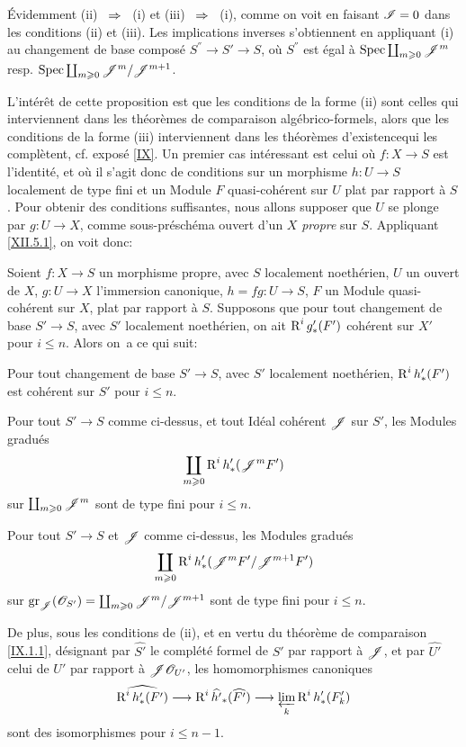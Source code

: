 \'Evidemment (ii) ~$\To$~ (i) et (iii) ~$\To$~ (i), comme on voit en faisant ${\mathscr I}=0$ dans les conditions (ii) et (iii). Les implications inverses s'obtiennent en appliquant (i) au changement de base compos\'e $S^{''}\to S'\to S$, o\`u $S^{''}$ est \'egal \`a $\operatorname{Spec} \coprod_{m\geqslant 0} {\mathscr J}^m$ resp. $\operatorname{Spec} \coprod_{m\geqslant 0} {\mathscr J}^m/{\mathscr J}^{m+1}$.

L'int\'er\^et de cette proposition est que les conditions de la forme (ii) sont celles qui interviennent dans les \og th\'eor\`emes de comparaison alg\'ebrico-formels\fg, alors que les conditions de la forme (iii) interviennent dans les \og th\'eor\`emes d'existence\fg qui les compl\`etent, cf. expos\'e \ref{IX}. Un premier cas int\'eressant est celui o\`u $f:X\to S$ est l'identit\'e, et o\`u il s'agit donc de conditions sur un morphisme $h:U\to S$ localement de type fini et un Module $F$ quasi-coh\'erent sur $U$ plat par rapport \`a $S$. Pour obtenir des conditions suffisantes, nous allons supposer que $U$ se plonge par $g:U\to X$, comme sous-pr\'esch\'ema ouvert d'un $X$ \emph{propre} sur $S$. Appliquant \ref{XII.5.1}, on voit donc:

\begin{corollaire} \label{XII.5.8}
Soient $f:X\to S$ un morphisme propre, avec $S$ localement noeth\'erien, $U$ un ouvert de $X$, $g:U\to X$ l'immersion canonique, $h=fg:U\to S$, $F$ un Module quasi-coh\'erent sur $X$, plat par rapport \`a $S$. Supposons que pour tout changement de base $S'\to S$, avec $S'$ localement noeth\'erien, on ait $\operatorname{R}^ig'_\ast(F')$ coh\'erent sur $X'$ pour $i\leq n$. Alors on~a ce qui suit:
\begin{enumeratei}
\item
Pour tout changement de base $S'\to S$, avec $S'$ localement noeth\'erien, $\operatorname{R}^ih'_\ast(F')$ est coh\'erent sur $S'$ pour $i\leq n$.
\item
Pour tout $S'\to S$ comme ci-dessus, et tout Id\'eal coh\'erent ${\mathscr J}$ sur $S'$, les Modules gradu\'es
\[
\coprod_{m\geqslant 0} \operatorname{R}^ih'_\ast({\mathscr J}^mF')
\]
sur $\coprod_{m\geqslant 0}{\mathscr J}^m$ sont de type fini pour $i\leq n$.
\item
Pour tout $S'\to S$ et ${\mathscr J}$ comme ci-dessus, les Modules gradu\'es
\[
\coprod_{m\geqslant 0} \operatorname{R}^ih'_\ast({\mathscr J}^mF'/{\mathscr J}^{m+1}F')
\]
sur $\operatorname{gr}_{\mathscr J}({\mathscr O}_{S'})=\coprod_{m\geqslant 0}{\mathscr J}^m/{\mathscr J}^{m+1}$ sont de type fini pour $i\leq n$.

De plus, sous les conditions de (ii), et en vertu du th\'eor\`eme de comparaison \ref{IX.1.1}, d\'esignant par $\widehat{S'}$ le compl\'et\'e formel de $S'$ par rapport \`a ${\mathscr J}$, et par $\widehat{U'}$ celui de $U'$ par rapport \`a ${\mathscr J}{\mathscr O}_{U'}$, les homomorphismes canoniques
\[
\widehat{\R^ih'_\ast(F')} \to \R^i\widehat{h'}_\ast(\widehat{F'}) \to \varprojlim_k\R^ih'_\ast(F'_k)
\]
sont des isomorphismes pour $i\leq n-1$.
\end{enumeratei}
\end{corollaire}

